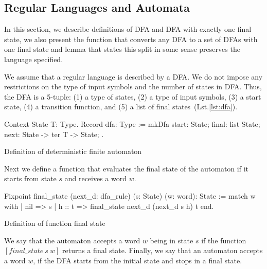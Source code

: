 \subsection{Regular Languages and Automata}

In this section, we describe definitions of DFA and DFA with exactly one final state, we also present the function that converts any DFA to a set of DFAs with one final state and lemma that states this split in some sense preserves the language specified.

We assume that a regular language is described by a DFA. We do not impose any restrictions on the type of input symbols and the number of states in DFA. Thus, the DFA is a 5-tuple: (1) a type of states, (2) a type of input symbols, (3) a start state, (4) a transition function, and (5) a list of final states~(Lst.\ref{lst:dfa}).

\begin{listing}[h]
    \begin{pyglist}[language=coq, numbers=none, numbersep=5pt]
  Context {State T: Type}.
  Record dfa: Type :=
    mkDfa {
      start: State;
      final: list State;
      next: State -> ter T -> State;
    }.
    \end{pyglist}
    \caption{Definition of deterministic finite automaton}
    \label{lst:dfa}
\end{listing}

Next we define a function that evaluates the final state of the automaton if it starts from state $s$ and receives a word $w$. 

\begin{listing}[h]
    \begin{pyglist}[language=coq, numbers=none, numbersep=5pt]
  Fixpoint final_state 
             (next_d: dfa_rule) 
             (s: State) 
             (w: word): State :=
    match w with
    | nil => s 
    | h :: t => final_state next_d 
                            (next_d s h)
                            t 
    end.
    \end{pyglist}
    \caption{Definition of function final state}
    \label{lst:verbments1}
\end{listing}

We say that the automaton accepts a word $w$ being in state $s$ if the function $[\textit{final\_state} \ s \ w]$ returns a final state.
Finally, we say that an automaton accepts a word $w$, if the DFA starts from the initial state and stops in a final state.


